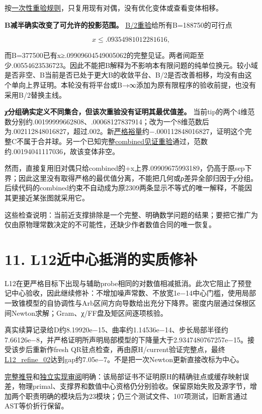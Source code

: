 \documentclass[
  10pt,
  a4paper,
]{article}
\begin{document}
按\href{../SOURCE_CHOICE_REPLAY_RULE_ZH.md}{一次性重验规则}，只复用现有对偶，没有优化变体或查看变体相移。

\textbf{B减半确实改变了可允许的投影范围。}
\href{../B_half_upper/report.json}{B/2重验}给所有B=188750的可行点

\[x\le .09354981012281616,\]

而B=377500已有x≥.09909604549005062的完整见证。两者间距至少.00554623536723。因此不能把B解释为不影响本有限问题的纯单位换元。较小域是否非空、B当前是否已处于更大B的收敛平台、B/2是否改善相移，均没有由这个单向上界证明。本轮没有将平台或B→∞添加为原有限程序的验收前提，也没有采用B/2替换主线。

\textbf{χ分组确实定义不同集合，但该次重验没有证明其最优值差。}
当前tip的两个4维范数分别约.00199999662808、.00068127837914；\newline 改为一个8维范数后为.002112848016827，超过.002。新\href{../chi_combined_replay/report.json}{严格裕量}约−.000112848016827，证明这个完整C不属于合并球。另一个已知完整\href{../chi_witness_replay/report.json}{combined见证重验}通过，范数约.00194041117036，故该变体非空。

然而，直接复用旧对偶只给combined的+x上界.09909675993189，仍高于原sep下界；因此这里没有取得严格的最优值分离，不能把几何或ρ差异全部归因于χ分组。后续代码的combined约束不自动成为原2309两条显示不等式的唯一解释，不能因其更接近某张图就采用它。

这些检查说明：当前近支撑排除是一个完整、明确数学问题的结果；要把它推广为仅由原物理常数决定的不可能性，还缺少作者数值合同的唯一恢复。

\section{11.
L12近中心抵消的实质修补}\label{l12ux8fd1ux4e2dux5fc3ux62b5ux6d88ux7684ux5b9eux8d28ux4feeux8865}

L12在更严格目标下出现与辅助probe相同的对数值相减抵消。此次它阻止了预登记中心验收，因此继续修补：不增加噪声常数、不放宽1e−14中心门槛，使用局部一致锥模型的自协调性与Arb区间方向导数给出充分下降界。密度内层通过保根区间Newton求解；Gram、χ/FF盘及矩区间逐项核验。

真实续算记录给D约8.19920e−15、曲率约1.14536e−14、步长局部半径约7.66126e−8，并严格证明所声明局部模型的下降量大于2.9347480767257e−15。接受该步后重新作fresh
QR驻点检查，再由原H/current验证完整点，最终\href{../L12_refine_02/report.json}{L12\_refine\_02}达到gap约7.05e−7。不是把一次Newton更新直接改标为中心。

\href{../LOCAL_DESCENT_PROOF_ZH.md}{完整推导}和\href{../LOCAL_DESCENT_IMPLEMENTATION_REVIEW.md}{独立实现审阅}明确：该局部证书不证明原H的精确驻点或缓存映射误差，物理primal、支撑界和数值中心资格仍分别验收。保留原始失败及源字节，增加两个职责明确的模块后为23模块；仍三个测试文件、107项测试，旧断言通过AST等价折行保留。
\end{document}
